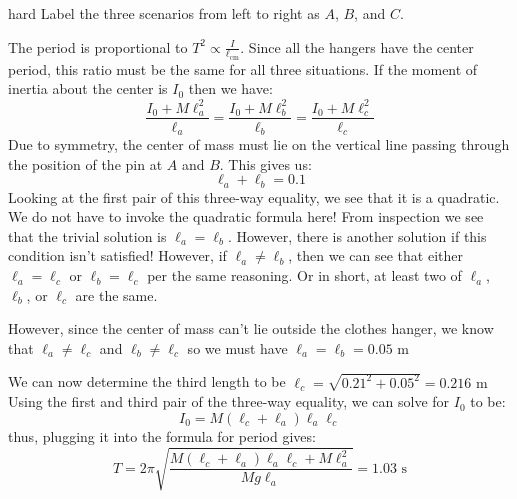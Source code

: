 \begin{solution}{hard}
Label the three scenarios from left to right as $A$, $B$, and $C$.

The period is proportional to $T^2 \propto \frac{I}{\ell_\text{cm}}$. Since all the hangers have the center period, this ratio must be the same for all three situations. If the moment of inertia about the center is $I_0$ then we have:
$$
\frac{I_0+M\ell_a^2}{\ell_a}=\frac{I_0+M\ell_b^2}{\ell_b}=\frac{I_0+M\ell_c^2}{\ell_c}
$$
Due to symmetry, the center of mass must lie on the vertical line passing through the position of the pin at $A$ and $B$. This gives us:
$$\ell_a+\ell_b=0.1$$
Looking at the first pair of this three-way equality, we see that it is a quadratic. We do not have to invoke the quadratic formula here! From inspection we see that the trivial solution is $\ell_a=\ell_b$. However, there is another solution if this condition isn't satisfied! However, if $\ell_a \neq \ell_b$, then we can see that either $\ell_a=\ell_c$ or $\ell_b=\ell_c$ per the same reasoning. Or in short, at least two of $\ell_a$, $\ell_b$, or $\ell_c$ are the same.

However, since the center of mass can't lie outside the clothes hanger, we know that $\ell_a \neq \ell_c$ and $\ell_b \neq \ell_c$ so we must have $\boxed{\ell_a=\ell_b=0.05 \text{ m}}$

We can now determine the third length to be $\ell_c=\sqrt{0.21^2+0.05^2}=0.216 \text{ m}$ Using the first and third pair of the three-way equality, we can solve for $I_0$ to be:
$$I_0 = M(\ell_c + \ell_a)\ell_a\ell_c$$
thus, plugging it into the formula for period gives:
$$T=2\pi\sqrt{\frac{M(\ell_c + \ell_a)\ell_a\ell_c+M\ell_a^2}{Mg\ell_a}}=\boxed{1.03 \text{ s}}$$
\end{solution}
